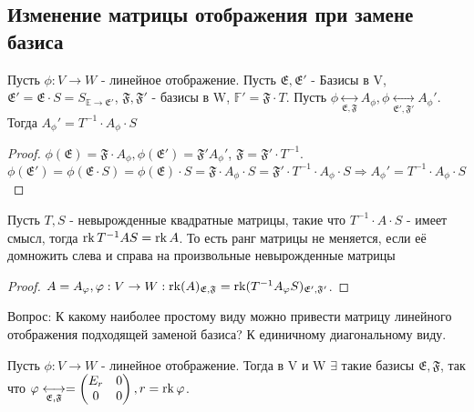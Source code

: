 \subsection{Изменение матрицы отображения при замене базиса}
\begin{theorem}
	Пусть \(\phi: V\to W\) - линейное отображение. Пусть \(\mathfrak{E}, \mathfrak{E}'\) - Базисы в V, \(\mathfrak{E}' = \mathfrak{E}\cdot S = S_{\mathbb{E}\to\mathfrak{E}'}\), \(\mathfrak{F}, \mathfrak{F}'\) - базисы в W, \(\mathbb{F}' = \mathfrak{F}\cdot T\). Пусть \(\phi\underset{\mathfrak{E}, \mathfrak{F}}{\longleftrightarrow}A_\phi, \phi\underset{\mathfrak{E}', \mathfrak{F}'}{\longleftrightarrow}A_\phi' \). Тогда \(A_\phi' = T^{-1}\cdot A_\phi\cdot S\)
\end{theorem}
\begin{proof}
	\(\phi(\mathfrak{E}) = \mathfrak{F}\cdot A_\phi, \phi(\mathfrak{E}') = \mathfrak{F}'A_\phi'\), \(\mathfrak{F} = \mathfrak{F}'\cdot T^{-1}\). \(\phi(\mathfrak{E}') = \phi(\mathfrak{E}\cdot S) = \phi(\mathfrak{E})\cdot S = \mathfrak{F}\cdot A_\phi\cdot S = \mathfrak{F}'\cdot T^{-1}\cdot A_\phi \cdot S\Longrightarrow A_\phi' = T^{-1}\cdot A_\phi\cdot S\)
\end{proof}
\begin{corollary}
	Пусть \(T, S\) - невырожденные квадратные матрицы, такие что \(T^{-1}\cdot A\cdot S\) - имеет смысл, тогда \(\operatorname{rk} T^{-1}AS = \operatorname{rk} A\). То есть ранг матрицы не меняется, если её домножить слева и справа на произвольные невырожденные матрицы
\end{corollary}
\begin{proof}
	\(A = A_{\varphi}, \varphi:V\to W: \operatorname{rk}(A)_{\mathfrak{E}, \mathfrak{F}} = \operatorname{rk} (T^{-1}A_{\varphi} S)_{\mathfrak{E}', \mathfrak{F}'}\).
\end{proof}
Вопрос: К какому наиболее простому виду можно привести матрицу линейного отображения подходящей заменой базиса? К единичному диагональному виду.
\begin{theorem}
	Пусть \(\phi: V\to W\) - линейное отображение. Тогда в V и W \(\exists\) такие базисы \(\mathfrak{E}, \mathfrak{F}\), так что \(\varphi\underset{\mathfrak{E}, \mathfrak{F}}{\longleftrightarrow} = \begin{pmatrix}
		E_r & 0 \\ 0 & 0
	\end{pmatrix}, r = \operatorname{rk} \varphi\). 
\end{theorem}
